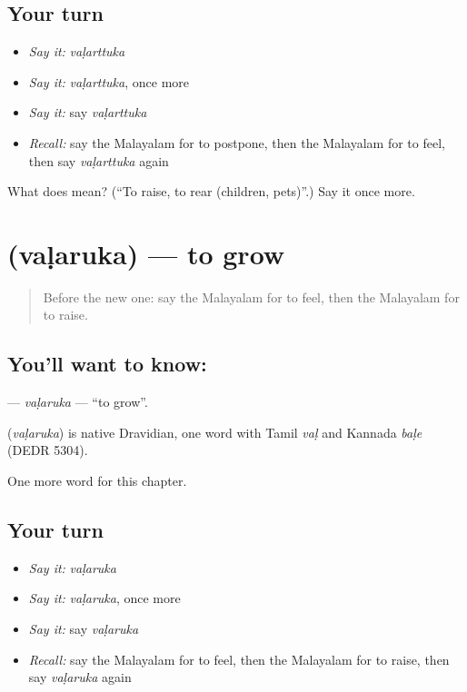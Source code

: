 \subsection*{Your turn}
\begin{itemize}
\raggedright
  \item \emph{Say it:} \emph{vaḷarttuka}
  \item \emph{Say it:} \emph{vaḷarttuka}, once more
  \item \emph{Say it:} say \emph{vaḷarttuka}
  \item \emph{Recall:} say the Malayalam for to postpone, then the Malayalam for to feel, then say \emph{vaḷarttuka} again
\end{itemize}

\begin{tcolorbox}[breakable,colback=teal!4,colframe=teal!35!black,title={Before you move on}]
What does  mean? (\textquotedblleft{}To raise, to rear (children, pets)\textquotedblright{}.) Say it once more.
\end{tcolorbox}
\section[\texorpdfstring{\ml{വളരുക} (vaḷaruka)}{വളരുക (vaḷaruka)}]{ (vaḷaruka) — to grow}

\label{lesson:ML-C307-valaruka}



\begin{quote}
Before the new one: say the Malayalam for to feel, then the Malayalam for to raise.
\end{quote}

\subsection*{You'll want to know: }
\textbf{} — \emph{vaḷaruka} — \textquotedblleft{}to grow\textquotedblright{}.

\begin{cousinweb}
\textbf{} (\emph{vaḷaruka}) is native Dravidian, one word with Tamil \emph{vaḷ} and Kannada \emph{baḷe} (DEDR 5304).
\end{cousinweb}

\begin{grammarlens}[title={What you've built}]
One more word for this chapter.
\end{grammarlens}

\subsection*{Your turn}
\begin{itemize}
\raggedright
  \item \emph{Say it:} \emph{vaḷaruka}
  \item \emph{Say it:} \emph{vaḷaruka}, once more
  \item \emph{Say it:} say \emph{vaḷaruka}
  \item \emph{Recall:} say the Malayalam for to feel, then the Malayalam for to raise, then say \emph{vaḷaruka} again
\end{itemize}

